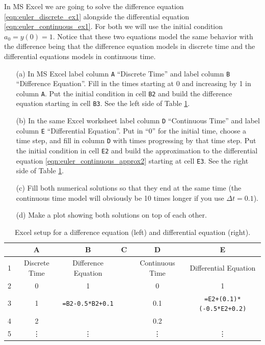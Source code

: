 \begin{problem}
    In MS Excel we are going to solve the difference equation
    \eqref{eqn:euler_discrete_ex1} alongside the differential equation
    \eqref{eqn:euler_continuous_ex1}.  For both we will use the initial condition $a_0 =
    y(0) = 1$.  Notice that these two equations model the same
    behavior with the difference being that the difference equation models in discrete
    time and the differential equations models in continuous time.
    \begin{enumerate}
        \item[(a)] In MS Excel label column \texttt{A} ``Discrete Time'' and label column
            \texttt{B} ``Difference Equation''.  Fill in the times starting at 0 and
            increasing by 1 in column \texttt{A}.  Put the initial condition in cell
            \texttt{B2} and build the difference equation starting in cell \texttt{B3}.
            See the left side of Table \ref{tab:euler_excel}.
        \item[(b)] In the same Excel worksheet label column \texttt{D} ``Continuous Time''
            and label column \texttt{E} ``Differential Equation''.  Put in ``0'' for the
            initial time, choose a time step, and fill in column \texttt{D} with times
            progressing by that time step.  Put the initial condition in cell \texttt{E2}
            and build the approximation to the differential equation
            \eqref{eqn:euler_continuous_approx2} starting at cell \texttt{E3}.
            See the right side of Table \ref{tab:euler_excel}.
        \item[(c)] Fill both numerical solutions so that they end at the same time (the
            continuous time model will obviously be 10 times longer if you use $\Delta t =
            0.1$).  
        \item[(d)] Make a plot showing both solutions on top of each other.
    \end{enumerate}
\end{problem}

\begin{table}[ht!]
    \centering
    \begin{tabular}{|c|c|c|c|c|c|}
        \hline
        & A & B & C & D & E \\
        \hline
        1 & Discrete Time & Difference Equation & & Continuous Time & Differential Equation \\
        \hline 
        2 & 0 & 1 &  & 0 & 1 \\
        3 & 1 & \verb|=B2-0.5*B2+0.1| &  & 0.1 & \verb|=E2+(0.1)*(-0.5*E2+0.2)| \\
        4 & 2 &  &  &  0.2 & \\
        5 & \vdots & \vdots & & \vdots & \vdots \\ \hline
    \end{tabular}
    \caption{Excel setup for a difference equation (left) and differential equation
    (right).}
    \label{tab:euler_excel}
\end{table}


